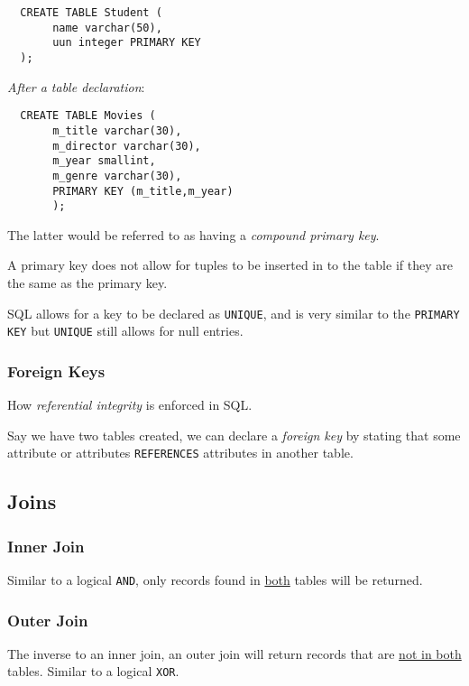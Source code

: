 \documentclass{article}
\begin{document}
\begin{lstlisting}
  CREATE TABLE Student (
       name varchar(50),
       uun integer PRIMARY KEY
  );
\end{lstlisting}

\textit{After a table declaration}:

\begin{lstlisting}
  CREATE TABLE Movies (
       m_title varchar(30),
       m_director varchar(30),
       m_year smallint,
       m_genre varchar(30),
       PRIMARY KEY (m_title,m_year)
       );
\end{lstlisting}

The latter would be referred to as having a \textit{compound primary key}.

A primary key does not allow for tuples to be inserted in to the table if they are the same as the primary key.

SQL allows for a key to be declared as \texttt{UNIQUE}, and is very similar to the \texttt{PRIMARY KEY} but \texttt{UNIQUE} still allows for null entries.

\subsubsection{Foreign Keys}

How \textit{referential integrity} is enforced in SQL.

Say we have two tables created, we can declare a \textit{foreign key} by stating that some attribute or attributes \texttt{REFERENCES} attributes in another table.

\subsection{Joins}

\subsubsection{Inner Join}

Similar to a logical \texttt{AND}, only records found in \underline{both} tables will be returned.

\subsubsection{Outer Join}

The inverse to an inner join, an outer join will return records that are \underline{not in both} tables. Similar to a logical \texttt{XOR}.
\end{document}
